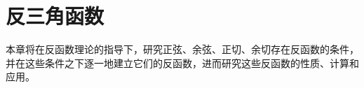 \chapter{反三角函数}
本章将在反函数理论的指导下，研究正弦、余弦、正切、余切存在反函数的条件，并在这些条件之下逐一地建立它们的反函数，进而研究这些反函数的性质、计算和应用。












































































































